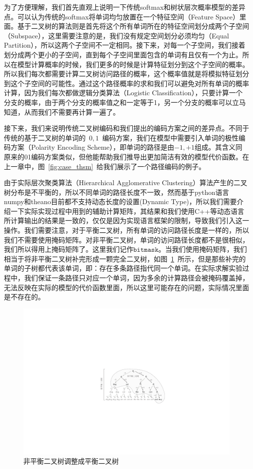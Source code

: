 为了方便理解，我们首先直观上说明一下传统softmax和树状层次概率模型的差异点。可以认为传统的softmax将单词均匀放置在一个特征空间（Feature Space）里面。基于二叉树的算法则是首先将这个所有单词所在的特征空间划分成两个子空间（Subspace），这里需要注意的是，我们没有规定空间划分必须均匀（Equal Partition），所以这两个子空间不一定相同。接下来，对每一个子空间，我们接着划分成两个更小的子空间，直到每个子空间里面包含的单词有且仅有一个为止。所以在模型计算概率的时候，我们更多的时候是计算特征划分到这个子空间的概率。所以我们每次都需要计算二叉树访问路径的概率，这个概率值就是将模拟特征划分到这个子空间的可能性。通过这个路径概率的求和我们可以避免对所有单词的概率计算，因为我们每次都做逻辑分类算法（Logistic Classification），只要计算一个分支的概率，由于两个分支的概率值之和一定等于1，另一个分支的概率可以立马知道，从而我们不需要再计算一遍了。


接下来，我们来说明传统二叉树编码和我们提出的编码方案之间的差异点。不同于传统的基于二叉树的单词的~$0,1$~编码方案，我们在模型中需要引入单词的极性编码方案（Polarity Encoding Scheme），即单词的路径是由$-1,+1$组成。其含义同原来的01编码方案类似，但他能帮助我们推导出更加简洁有效的模型代价函数。在上一章中，图~\ref{fig:case_thsm}~给我们展示了一个路径编码的例子。


由于实际层次聚类算法（Hierarchical Agglomerative Clustering）算法产生的二叉树分布是不平衡的，所以不同单词的路径长度不一致，然而基于python语言numpy和theano目前都不支持动态长度的设置(Dynamic Type)，所以我们需要介绍一下实际实现过程中用到的辅助计算矩阵，其结果和我们使用C++等动态语言所计算输出的结果是一致的，仅仅是因为实现语言框架的限制，导致我们引入这一操作。我们需要注意，对于平衡二叉树，所有单词的访问路径长度是一样的，所以我们不需要使用掩码矩阵。对非平衡二叉树，单词的访问路径长度都不是很相似，我们所以得用上掩码矩阵了。这里我们记作$\mathtt{bitmask}$。当我们使用掩码矩阵，我们相当于将非平衡二叉树补完形成一颗完全二叉树，如图~\ref{fig:case_thsm_mask}~所示，但是那些补完的单词的子树都代表该单词，即：存在多条路径指代同一个单词。在实际求解实验过程中，我们保证一条路径只对应一个单词，因为多余的计算路径会被掩码覆盖掉，无法反映在实际的模型的代价函数里面，所以这里可能存在的问题，实际情况里面是不存在的。


\begin{figure}[!h]
  \centering
\includegraphics[width=0.9\linewidth]{./figures/thsm-example-mask.pdf}
\caption{非平衡二叉树调整成平衡二叉树}\label{fig:case_thsm_mask}
\end{figure}

